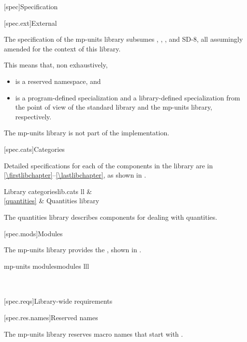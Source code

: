 [spec]{Specification}

[spec.ext]{External}

\pnum
The specification of the mp-units library subsumes
, , , and SD-8,
all assumingly amended for the context of this library.
\begin{note}
This means that, non exhaustively,
\begin{itemize}
\item {} is a reserved namespace, and
\item
{}
is a program-defined specialization and a library-defined specialization
from the point of view of the \Cpp{} standard library and the mp-units library, respectively.
\end{itemize}
\end{note}

\pnum
The mp-units library is not part of the \Cpp{} implementation.

[spec.cats]{Categories}

\pnum
Detailed specifications for each of the components in the library are in
\ref{\firstlibchapter}--\ref{\lastlibchapter},
as shown in .

\begin{floattable}{Library categories}{lib.cats}
{ll}
\topline
{}        &                               \\ \capsep
\ref{quantities}        & Quantities library                              \\
\end{floattable}

\pnum
The quantities library
describes components for dealing with quantities.

[spec.mods]{Modules}

\pnum
The mp-units library provides the
,
shown in .

\begin{multicolfloattable}{mp-units modules}{modules}
{lll}
                      \\
\columnbreak
{}                 \\
\columnbreak
{}              \\
\end{multicolfloattable}

[spec.reqs]{Library-wide requirements}

[spec.res.names]{Reserved names}

\pnum
The mp-units library reserves macro names that start with
.
